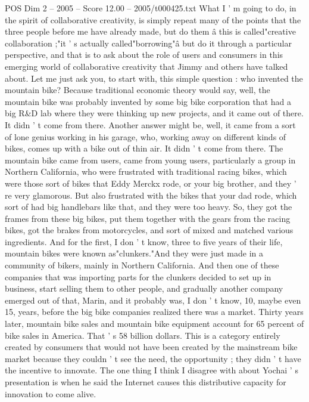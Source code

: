 \begin{textsample}{POS Dim 2 – 2005 – Score 12.00 – 2005/t000425.txt}  \label{ex:f2_pos_022}
What I ' m going to do, in the spirit of collaborative creativity, is simply repeat many of the points that the three people before me have already made, but do them â this is called"creative collaboration ;"it ' s actually called"borrowing"â but do it through a particular perspective, and that is to ask about the role of users and consumers in this emerging world of collaborative creativity that Jimmy and others have talked about.
Let me just ask you, to start with, this simple question : who invented the mountain bike?
Because traditional economic theory would say, well, the mountain bike was probably invented by some big bike corporation that had a big R\&D lab where they were thinking up new projects, and it came out of there.
It didn ' t come from there.
Another answer might be, well, it came from a sort of lone genius working in his garage, who, working away on different kinds of bikes, comes up with a bike out of thin air.
It didn ' t come from there.
The mountain bike came from users, came from young users, particularly a group in Northern California, who were frustrated with traditional racing bikes, which were those sort of bikes that Eddy Merckx rode, or your big brother, and they ' re very glamorous.
But also frustrated with the bikes that your dad rode, which sort of had big handlebars like that, and they were too heavy.
So, they got the frames from these big bikes, put them together with the gears from the racing bikes, got the brakes from motorcycles, and sort of mixed and matched various ingredients.
And for the first, I don ' t know, three to five years of their life, mountain bikes were known as"clunkers."And they were just made in a community of bikers, mainly in Northern California.
And then one of these companies that was importing parts for the clunkers decided to set up in business, start selling them to other people, and gradually another company emerged out of that, Marin, and it probably was, I don ' t know, 10, maybe even 15, years, before the big bike companies realized there was a market.
Thirty years later, mountain bike sales and mountain bike equipment account for 65 percent of bike sales in America.
That ' s 58 billion dollars.
This is a category entirely created by consumers that would not have been created by the mainstream bike market because they couldn ' t see the need, the opportunity ; they didn ' t have the incentive to innovate.
The one thing I think I disagree with about Yochai ' s presentation is when he said the Internet causes this distributive capacity for innovation to come alive.

\end{textsample}
